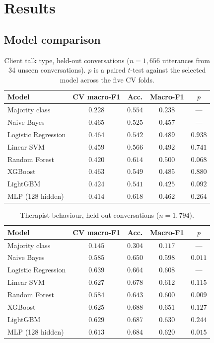 \documentclass[conference]{IEEEtran}
\begin{document}
\section{Results}

\subsection{Model comparison}

\begin{table}[t]
\caption{Client talk type, held-out conversations ($n=1{,}656$ utterances
from 34 unseen conversations). $p$ is a paired $t$-test against the
selected model across the five CV folds.}
\label{tab:client}
\centering
\footnotesize
\begin{tabular}{lcccc}
\toprule
Model & CV macro-F1 & Acc. & Macro-F1 & $p$ \\
\midrule
Majority class       & $0.228$ & $0.554$ & $0.238$ & --- \\
Naive Bayes          & $\mathbf{0.465}$ & $0.525$ & $0.457$ & --- \\
Logistic Regression  & $0.464$ & $0.542$ & $0.489$ & $0.938$ \\
Linear SVM           & $0.459$ & $0.566$ & $0.492$ & $0.741$ \\
Random Forest        & $0.420$ & $0.614$ & $\mathbf{0.500}$ & $0.068$ \\
XGBoost              & $0.463$ & $0.549$ & $0.485$ & $0.880$ \\
LightGBM             & $0.424$ & $0.541$ & $0.425$ & $0.092$ \\
MLP (128 hidden)     & $0.414$ & $\mathbf{0.618}$ & $0.462$ & $0.264$ \\
\bottomrule
\end{tabular}
\end{table}

\begin{table}[t]
\caption{Therapist behaviour, held-out conversations ($n=1{,}794$).}
\label{tab:therapist}
\centering
\footnotesize
\begin{tabular}{lcccc}
\toprule
Model & CV macro-F1 & Acc. & Macro-F1 & $p$ \\
\midrule
Majority class       & $0.145$ & $0.304$ & $0.117$ & --- \\
Naive Bayes          & $0.585$ & $0.650$ & $0.598$ & $0.011$ \\
Logistic Regression  & $\mathbf{0.639}$ & $0.664$ & $0.608$ & --- \\
Linear SVM           & $0.627$ & $0.678$ & $0.612$ & $0.115$ \\
Random Forest        & $0.584$ & $0.643$ & $0.600$ & $0.009$ \\
XGBoost              & $0.625$ & $\mathbf{0.688}$ & $\mathbf{0.651}$ & $0.127$ \\
LightGBM             & $0.629$ & $0.687$ & $0.630$ & $0.244$ \\
MLP (128 hidden)     & $0.613$ & $0.684$ & $0.620$ & $0.015$ \\
\bottomrule
\end{tabular}
\end{table}
\end{document}
